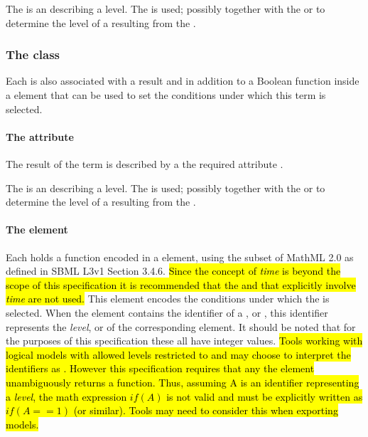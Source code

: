 The  is an  describing a level.  The  is used; possibly together with the  or  to determine the level of a \QualitativeSpecies resulting from the \Transition. 

\subsubsection{The  class}
\label{sec:function-term}

Each \FunctionTerm is also associated with a result  and in addition to a Boolean function inside a  element that can be used to set the conditions under which this term is selected.

\paragraph{The  attribute}
The result of the term is described by a the required attribute .

The  is an  describing a level.   The  is used; possibly together with the  or  to determine the level of a \QualitativeSpecies resulting from the \Transition. 

\paragraph{The  element}
Each  holds a  function encoded in a  element, using the subset of MathML 2.0 as defined in SBML L3v1 Section 3.4.6. \hl{Since the concept of \emph{time} is beyond the scope of this specification it is recommended that the   and  that explicitly involve \emph{time} are not used.}
This element encodes the conditions under which the \FunctionTerm is selected. When the  element contains the identifier of a \QualitativeSpecies, \Input or \Output, this identifier represents the \emph{level},  or  of the corresponding element. It should be noted that for the purposes of this specification these all have integer values. \hl{Tools working with logical models with allowed levels restricted to  and  may choose to interpret the identifiers as .  However this specification  requires that any the  element unambiguously returns a  function. Thus, assuming A is an identifier representing a \emph{level}, the math expression $if (A)$ is not valid and must be explicitly written as $if (A == 1)$ (or similar). Tools may need to consider this when exporting models.}

